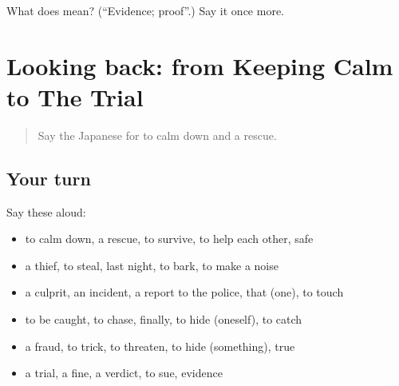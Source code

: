 \begin{tcolorbox}[breakable,colback=teal!4,colframe=teal!35!black,title={Before you move on}]
What does  mean? (\textquotedblleft{}Evidence; proof\textquotedblright{}.) Say it once more.
\end{tcolorbox}
\section[(dialogue)]{Looking back: from Keeping Calm to The Trial}

\label{lesson:JA-R273-review-268-273}



\begin{quote}
Say the Japanese for to calm down and a rescue.
\end{quote}

\subsection*{Your turn}
Say these aloud:

\begin{itemize}
\raggedright
  \item to calm down, a rescue, to survive, to help each other, safe
  \item a thief, to steal, last night, to bark, to make a noise
  \item a culprit, an incident, a report to the police, that (one), to touch
  \item to be caught, to chase, finally, to hide (oneself), to catch
  \item a fraud, to trick, to threaten, to hide (something), true
  \item a trial, a fine, a verdict, to sue, evidence
\end{itemize}

